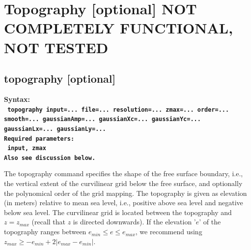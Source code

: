 \documentclass[11pt]{report}
\begin{document}
\section{Topography [optional] NOT COMPLETELY FUNCTIONAL, NOT TESTED}

\subsection{topography [optional]}
\label{keyword:topo}
\begin{flushleft}
\bf
Syntax:\\
\tt 
topography input=... file=... resolution=... zmax=... order=... smooth=... gaussianAmp=... gaussianXc=... gaussianYc=... gaussianLx=... gaussianLy=...\\
\bf 
Required parameters:\\
\tt 
input, zmax\\
\rm Also see discussion below.
\end{flushleft}
The topography command specifies the shape of the free surface boundary, i.e., the vertical extent
of the curvilinear grid below the free surface, and optionally the polynomical order of the grid
mapping. The topography is given as elevation (in meters) relative to mean sea level, i.e., positive
above sea level and negative below sea level. The curvilinear grid is located between the topography
and $z=z_{max}$ (recall that $z$ is directed downwards). If the elevation '$e$' of the topography
ranges between $e_{min}\leq e \leq e_{max}$, we recommend using $z_{max} \geq -e_{min} + 2|e_{max} -
e_{min}|$.
\end{document}

